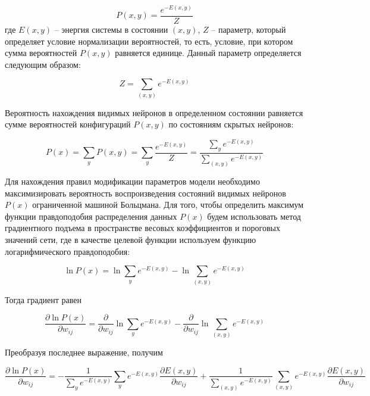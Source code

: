 \begin{equation*}
	P(x, y)=\frac{e^{-E(x,y)}}{Z}
\end{equation*}
где $E(x,y)$ -- энергия системы в состоянии $(x,y)$, $Z$ -- параметр, который определяет условие нормализации вероятностей, то есть, условие, при котором сумма вероятностей $P(x, y)$ равняется единице. Данный параметр определяется следующим образом:
	
\begin{equation*}
	Z=\sum_{(x,y)} e^{-E(x,y)}
\end{equation*}
	
Вероятность нахождения видимых нейронов в определенном состоянии равняется сумме вероятностей  конфигураций $P(x,y)$ по состояниям скрытых нейронов:
	
\begin{equation*}
	P(x)=\sum_y P(x,y)=\sum_y \frac{e^{-E(x,y)}}{Z}=\frac{\sum_y e^{-E(x,y)}}{\sum_{(x,y)} e^{-E(x,y)}}
\end{equation*}
	
Для нахождения правил модификации параметров модели необходимо максимизировать вероятность воспроизведения состояний видимых нейронов $P(x)$ ограниченной машиной Больцмана. Для того, чтобы определить максимум функции правдоподобия распределения данных $P(x)$ будем использовать метод градиентного подъема в пространстве весовых коэффициентов и пороговых значений сети, где в качестве целевой функции используем функцию логарифмического правдоподобия:
	
\begin{equation*}
	\ln P(x)=\ln \sum_y e^{-E(x,y)}-\ln \sum_{(x,y)} e^{-E(x,y)}
\end{equation*}
	
Тогда градиент равен
	
\begin{equation*}
	\frac{\partial \ln P(x)}{\partial w_{ij}}=\frac{\partial}{\partial w_{ij}}\ln \sum_y e^{-E(x,y)}-\frac{\partial}{\partial w_{ij}}\ln\sum_{(x,y)} e^{-E(x,y)}
\end{equation*}
	
Преобразуя последнее выражение, получим
	
\begin{equation*}
	\frac{\partial \ln P(x)}{\partial w_{ij}}=-\frac{1}{\sum_y e^{-E(x,y)}}\sum_y e^{-E(x,y)}\frac{\partial E(x,y)}{\partial w_{ij}}+\frac{1}{\sum_{(x,y)} e^{-E(x,y)}}\sum_{(x,y)} e^{-E(x,y)}\frac{\partial E(x,y)}{\partial w_{ij}}
\end{equation*}
	
